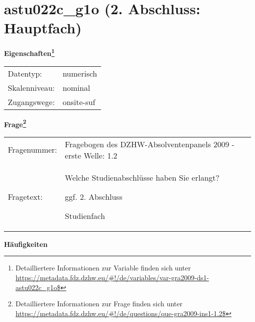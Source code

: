 
    \setcounter{footnote}{0}

    \vspace*{-1.8cm}
	\section{astu022c\_g1o (2. Abschluss: Hauptfach)}
	\label{section:astu022c_g1o}



    \vspace*{0.5cm}
    \noindent\textbf{Eigenschaften\footnote{Detailliertere Informationen zur Variable finden sich unter
		\url{https://metadata.fdz.dzhw.eu/\#!/de/variables/var-gra2009-ds1-astu022c_g1o$}}}\\
	\begin{tabularx}{\hsize}{@{}lX}
	Datentyp: & numerisch \\
	Skalenniveau: & nominal \\
	Zugangswege: &
	  onsite-suf
 \\
    \end{tabularx}



				\vspace*{0.5cm}
                \noindent\textbf{Frage\footnote{Detailliertere Informationen zur Frage finden sich unter
		              \url{https://metadata.fdz.dzhw.eu/\#!/de/questions/que-gra2009-ins1-1.2$}}}\\
				\begin{tabularx}{\hsize}{@{}lX}
					Fragenummer: &
					  Fragebogen des DZHW-Absolventenpanels 2009 - erste Welle:
					  1.2
 \\
					Fragetext: & Welche Studienabschlüsse haben Sie erlangt?\par  ggf. 2. Abschluss\par  Studienfach \\
				\end{tabularx}





        		\vspace*{0.5cm}
                \noindent\textbf{Häufigkeiten}

